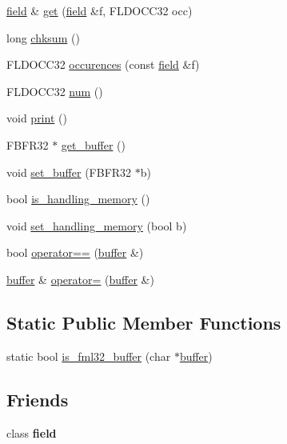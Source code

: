 \begin{DoxyCompactItemize}
\hyperlink{classatmi_1_1field}{field} \& \hyperlink{classatmi_1_1buffer_a864adb4d0153e6be38a7905c994915e1}{get} (\hyperlink{classatmi_1_1field}{field} \&f, F\+L\+D\+O\+C\+C32 occ)
\item 
long \hyperlink{classatmi_1_1buffer_a4ae9fa419098eb136ae3681ad90ccafb}{chksum} ()
\item 
F\+L\+D\+O\+C\+C32 \hyperlink{classatmi_1_1buffer_a57ff1b2ed449d59d4ec936e9e79a5d1a}{occurences} (const \hyperlink{classatmi_1_1field}{field} \&f)
\item 
F\+L\+D\+O\+C\+C32 \hyperlink{classatmi_1_1buffer_a3ec1c691a444915993628b2774503d18}{num} ()
\item 
void \hyperlink{classatmi_1_1buffer_a04d31b2fb8d27274ad81e8064eec3765}{print} ()
\item 
F\+B\+F\+R32 $\ast$ \hyperlink{classatmi_1_1buffer_aa9aa5382717ed17a2047db2779f8f0ec}{get\+\_\+buffer} ()
\item 
void \hyperlink{classatmi_1_1buffer_ade8853e7c2ae10dcd024b34049e99af3}{set\+\_\+buffer} (F\+B\+F\+R32 $\ast$b)
\item 
bool \hyperlink{classatmi_1_1buffer_aae543cf7816b338d20031993c18ce491}{is\+\_\+handling\+\_\+memory} ()
\item 
void \hyperlink{classatmi_1_1buffer_a68f05d1dbd040062850feeba5aa188fc}{set\+\_\+handling\+\_\+memory} (bool b)
\item 
bool \hyperlink{classatmi_1_1buffer_a580571a4a3cf75eafe90543e9ab07333}{operator==} (\hyperlink{classatmi_1_1buffer}{buffer} \&)
\item 
\hyperlink{classatmi_1_1buffer}{buffer} \& \hyperlink{classatmi_1_1buffer_a5cb08586cc2e633a3b0e80755dda53cd}{operator=} (\hyperlink{classatmi_1_1buffer}{buffer} \&)
\end{DoxyCompactItemize}
\subsection*{Static Public Member Functions}
\begin{DoxyCompactItemize}
\item 
static bool \hyperlink{classatmi_1_1buffer_a38aca9956db23474cb19d4c737b08262}{is\+\_\+fml32\+\_\+buffer} (char $\ast$\hyperlink{classatmi_1_1buffer}{buffer})
\end{DoxyCompactItemize}
\subsection*{Friends}
\begin{DoxyCompactItemize}
\item 
class {\bfseries field}\hypertarget{classatmi_1_1buffer_acd53905ae10cba58b4337aefe648aec6}{}\label{classatmi_1_1buffer_acd53905ae10cba58b4337aefe648aec6}

\end{DoxyCompactItemize}
